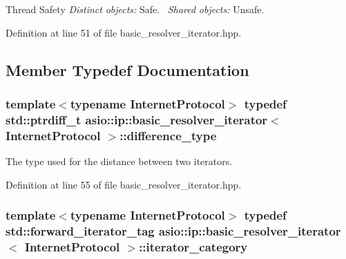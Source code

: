 \begin{DoxyParagraph}{Thread Safety}
{\itshape Distinct} {\itshape objects\+:} Safe.~\newline
{\itshape Shared} {\itshape objects\+:} Unsafe. 
\end{DoxyParagraph}


Definition at line 51 of file basic\+\_\+resolver\+\_\+iterator.\+hpp.



\subsection{Member Typedef Documentation}
\hypertarget{classasio_1_1ip_1_1basic__resolver__iterator_a6c0d555e8e97958833c023e6545a150c}{}
\subsubsection[{difference\+\_\+type}]{\setlength{\rightskip}{0pt plus 5cm}template$<$typename Internet\+Protocol$>$ typedef std\+::ptrdiff\+\_\+t {\bf asio\+::ip\+::basic\+\_\+resolver\+\_\+iterator}$<$ Internet\+Protocol $>$\+::{\bf difference\+\_\+type}}\label{classasio_1_1ip_1_1basic__resolver__iterator_a6c0d555e8e97958833c023e6545a150c}


The type used for the distance between two iterators. 



Definition at line 55 of file basic\+\_\+resolver\+\_\+iterator.\+hpp.

\hypertarget{classasio_1_1ip_1_1basic__resolver__iterator_afd328785b7b40036161e46d59a8a126d}{}
\subsubsection[{iterator\+\_\+category}]{\setlength{\rightskip}{0pt plus 5cm}template$<$typename Internet\+Protocol$>$ typedef std\+::forward\+\_\+iterator\+\_\+tag {\bf asio\+::ip\+::basic\+\_\+resolver\+\_\+iterator}$<$ Internet\+Protocol $>$\+::{\bf iterator\+\_\+category}}\label{classasio_1_1ip_1_1basic__resolver__iterator_afd328785b7b40036161e46d59a8a126d}



